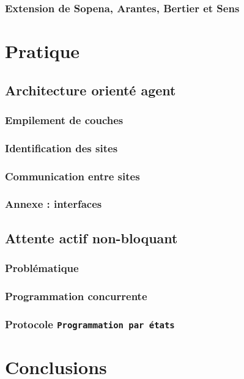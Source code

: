 \documentclass[a4paper,french,towsides,10pt]{book}
\begin{document}
\subsection{Extension de Sopena, Arantes, Bertier et Sens}


\chapter{Pratique}

\section{Architecture orienté agent}
\subsection{Empilement de couches}

\subsection{Identification des sites}

\subsection{Communication entre sites}

\subsection{Annexe : interfaces}


\section{Attente actif non-bloquant}
\subsection{Problématique}

\subsection{Programmation concurrente}

\subsection{Protocole \texttt{Programmation par états}}



\chapter*{Conclusions}

\end{document}
